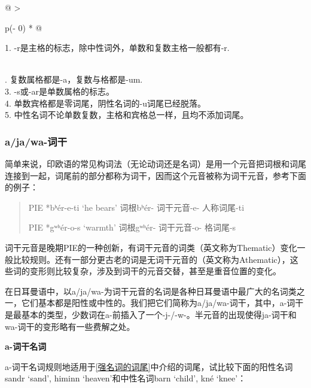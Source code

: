 \begin{longtable}[]{@{}
  >{\raggedright\arraybackslash}p{(\columnwidth - 0\tabcolsep) * }@{}}
  \toprule\noalign{}
  \begin{minipage}[b]{\linewidth}\raggedright
    1. -r是主格的标志，除中性词外，单数和复数主格一般都有-r.
  \end{minipage}     \\
  \midrule\noalign{}
  \endhead
  \bottomrule\noalign{}
  . 复数属格都是-a，复数与格都是-um.                         \\
  3. -s或-ar是单数属格的标志。                                \\
  4. 单数宾格都是零词尾，阴性名词的-u词尾已经脱落。           \\
  5. 中性名词不论单数复数，主格和宾格总一样，且均不添加词尾。 \\
\end{longtable}

\subsubsection{a/ja/wa-词干}\label{a/ja/wa-词干}

简单来说，印欧语的常见构词法（无论动词还是名词）是用一个元音把词根和词尾连接到一起，词尾前的部分都称为词干，因而这个元音被称为词干元音，参考下面的例子：

\begin{quote}
  PIE *bʰér-e-ti `he bears' 词根bʰér- 词干元音-e- 人称词尾-ti

  PIE *gʷʰér-o-s `warmth' 词根gʷʰér- 词干元音-o- 格词尾-s
\end{quote}

词干元音是晚期PIE的一种创新，有词干元音的词类（英文称为Thematic）变化一般比较规则。还有一部分更古老的词是无词干元音的（英文称为Athematic），这些词的变形则比较复杂，涉及到词干的元音交替，甚至是重音位置的变化。

在日耳曼语中，以a/ja/wa-为词干元音的名词是各种日耳曼语中最广大的名词类之一，它们基本都是阳性或中性的。我们把它们简称为a/ja/wa-词干，其中，a-词干是最基本的类型，少数词在a-前插入了一个-j-/-w-。半元音的出现使得ja-词干和wa-词干的变形略有一些费解之处。

\textbf{a-词干名词}

a-词干名词规则地适用于\ref{强名词的词尾}中介绍的词尾，试比较下面的阳性名词sandr
`sand', himinn `heaven'和中性名词barn `child', kné `knee'：

